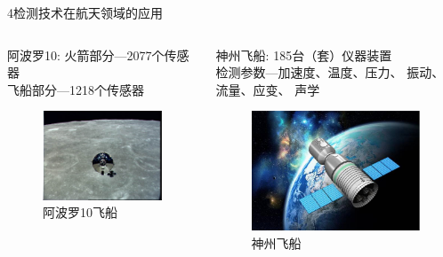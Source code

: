 \documentclass[10pt]{beamer}
\begin{document}
\begin{frame}{4检测技术在航天领域的应用}

    \begin{columns}
        \begin{column}{0.5\textwidth}
        
        \begin{exampleblock}{阿波罗10:}
        火箭部分---2077个传感器\\
        飞船部分---1218个传感器

      \end{exampleblock}
             \begin{figure}[htbp] 
            \centering\includegraphics[width=2.25in]{source/intro7.jpg} \caption{阿波罗10飞船}\label{fig:7} 
            \end{figure}
        \end{column}
        \begin{column}{0.5\textwidth}
        \begin{exampleblock}{神州飞船:}
        185台（套）仪器装置\\
        检测参数---加速度、温度、压力、 振动、流量、应变、  声学

      \end{exampleblock}
        \begin{figure}[htbp] 
            \centering\includegraphics[width=2.25in]{source/intro8.jpg} \caption{神州飞船}\label{fig:8} 
            \end{figure}
        
        \end{column}
        \end{columns}
\end{frame}
\end{document}
